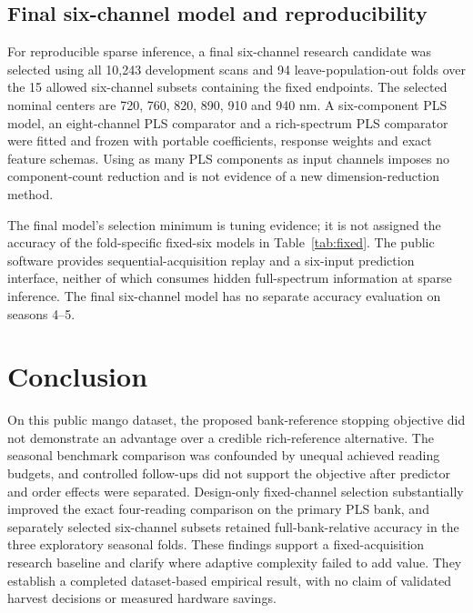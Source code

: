 \documentclass[Review,sagev,times]{sagej}
\begin{document}
\subsection{Final six-channel model and reproducibility}
For reproducible sparse inference, a final six-channel research candidate was selected using all 10,243 development scans and 94 leave-population-out folds over the 15 allowed six-channel subsets containing the fixed endpoints. The selected nominal centers are 720, 760, 820, 890, 910 and 940 nm. A six-component PLS model, an eight-channel PLS comparator and a rich-spectrum PLS comparator were fitted and frozen with portable coefficients, response weights and exact feature schemas. Using as many PLS components as input channels imposes no component-count reduction and is not evidence of a new dimension-reduction method.

The final model's selection minimum is tuning evidence; it is not assigned the accuracy of the fold-specific fixed-six models in Table~\ref{tab:fixed}. The public software provides sequential-acquisition replay and a six-input prediction interface, neither of which consumes hidden full-spectrum information at sparse inference. The final six-channel model has no separate accuracy evaluation on seasons 4--5.

\section{Conclusion}
On this public mango dataset, the proposed bank-reference stopping objective did not demonstrate an advantage over a credible rich-reference alternative. The seasonal benchmark comparison was confounded by unequal achieved reading budgets, and controlled follow-ups did not support the objective after predictor and order effects were separated. Design-only fixed-channel selection substantially improved the exact four-reading comparison on the primary PLS bank, and separately selected six-channel subsets retained full-bank-relative accuracy in the three exploratory seasonal folds. These findings support a fixed-acquisition research baseline and clarify where adaptive complexity failed to add value. They establish a completed dataset-based empirical result, with no claim of validated harvest decisions or measured hardware savings.





\end{document}

